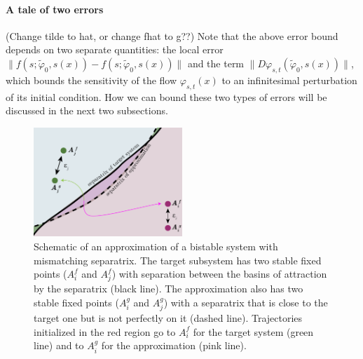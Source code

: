 \documentclass{article}
\newcommand{\ascomment}[1]{\textcolor{ascolor}{(#1)}}
\theoremstyle{definition} \newtheorem{definition}{Definition}
\theoremstyle{remark} \newtheorem{remark}{Remark}
\newcounter{ct}
\begin{document}
\paragraph{A tale of two errors}
\ascomment{Change tilde to hat, or change fhat to g??}
Note that the above error bound depends on two separate quantities: the local error 
$\| f(s; \tilde{\varphi}_0, s(x)) - f(s; \tilde{\varphi}_0, s(x)) \|$ 
 and the term 
$\| D\varphi_{s,t}(\tilde{\varphi}_0, s(x)) \|$, 
which bounds the sensitivity of the flow $\varphi_{s,t}(x)$ to an infinitesimal perturbation of its initial condition.
How we can bound these two types of errors will be discussed in the next two subsections.%

\setlength\belowcaptionskip{-1ex}
\begin{figure}
  \centering
  \includegraphics[width=0.5\textwidth]{separatrices}
  \caption{
	Schematic of an approximation of a bistable system with mismatching separatrix. %
	The target subsystem has two stable fixed points ($A_i^f$ and $A_j^f$) with separation between the basins of attraction by the separatrix (black line).
	The approximation also has two stable fixed points ($A_i^g$ and $A_j^g$) with a separatrix that is close to the target one but is not perfectly on it (dashed line).
	Trajectories initialized in the red region go to $A_i^f$ for the target system (green line) and to $A_i^g$ for the approximation (pink line). %
  }\label{fig:separatrices}
\end{figure}
\end{document}
